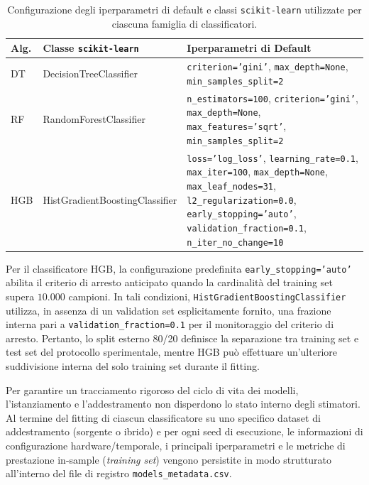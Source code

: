 \begin{table}[H]
    \centering
    \small
    \caption{Configurazione degli iperparametri di default e classi \texttt{scikit-learn} utilizzate per ciascuna famiglia di classificatori.}
    \label{tab:hyperparameters_summary}
    \begin{tabularx}{\textwidth}{l l >{\raggedright\arraybackslash}X}
        \toprule
        \textbf{Alg.} & \textbf{Classe \texttt{scikit-learn}} & \textbf{Iperparametri di Default} \\
        \midrule
        DT & DecisionTreeClassifier & 
        \texttt{criterion='gini'}, 
        \texttt{max\_depth=None}, 
        \texttt{min\_samples\_split=2} \\
        \addlinespace
        RF & RandomForestClassifier & 
        \texttt{n\_estimators=100}, 
        \texttt{criterion='gini'}, 
        \texttt{max\_depth=None}, 
        \texttt{max\_features='sqrt'}, 
        \texttt{min\_samples\_split=2} \\
        \addlinespace
        HGB & HistGradientBoostingClassifier & 
        \texttt{loss='log\_loss'}, 
        \texttt{learning\_rate=0.1}, 
        \texttt{max\_iter=100}, 
        \texttt{max\_depth=None}, 
        \texttt{max\_leaf\_nodes=31}, 
        \texttt{l2\_regularization=0.0}, 
        \texttt{early\_stopping='auto'}, 
        \texttt{validation\_fraction=0.1}, 
        \texttt{n\_iter\_no\_change=10} \\
        \bottomrule
    \end{tabularx}
\end{table}
Per il classificatore HGB, la configurazione predefinita \texttt{early\_stopping='auto'} abilita il criterio di arresto anticipato quando la cardinalità del training set supera $10.000$ campioni. 
In tali condizioni, \texttt{HistGradientBoostingClassifier} utilizza, in assenza di un validation set esplicitamente fornito, una frazione interna pari a \texttt{validation\_fraction=0.1} per il monitoraggio del criterio di arresto.
Pertanto, lo split esterno 80/20 definisce la separazione tra training set e test set del protocollo sperimentale, mentre HGB può effettuare un'ulteriore suddivisione interna del solo training set durante il fitting.

Per garantire un tracciamento rigoroso del ciclo di vita dei modelli, l'istanziamento e l'addestramento non disperdono lo stato interno degli stimatori. 
Al termine del fitting di ciascun classificatore su uno specifico dataset di addestramento (sorgente o ibrido) e per ogni seed di esecuzione, le informazioni di configurazione hardware/temporale, i principali iperparametri e le metriche di prestazione in-sample (\textit{training set}) vengono persistite in modo strutturato all'interno del file di registro \texttt{models\_metadata.csv}.

